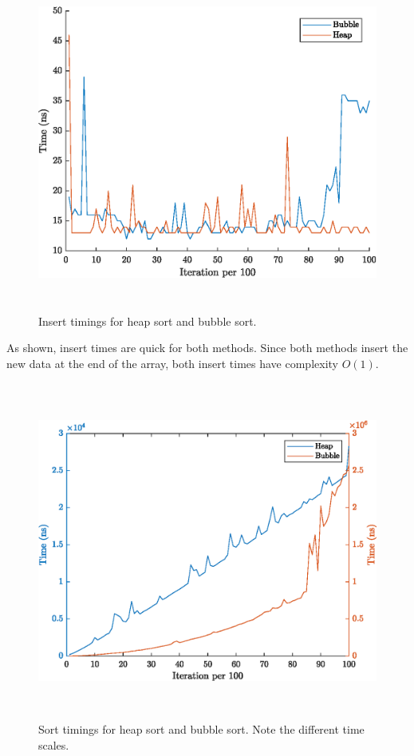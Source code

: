 \documentclass{article}
\begin{document}
\newpage

\begin{figure}[!htb]
    \centering
    \includegraphics[height=30em]{BubbleHeapInsert.eps}
    \caption{Insert timings for heap sort and bubble sort.}
\end{figure}

As shown, insert times are quick for both methods. Since both methods insert the new data at the end of the array, both insert times have complexity \( O(1) \).

\hfill \break

\begin{figure}[!htb]
    \centering
    \includegraphics[height=30em]{BubbleHeapSort.eps}
    \caption{Sort timings for heap sort and bubble sort. Note the different time scales.}
\end{figure}
\end{document}
